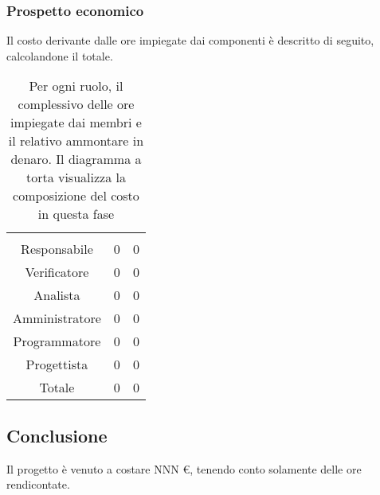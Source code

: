 \subsubsection{Prospetto economico}
Il costo derivante dalle ore impiegate dai componenti è descritto di seguito, calcolandone il totale.

\begin{table}[hbt!]
{\setlength{\parindent}{0cm}
\begin{minipage}{.43\textwidth}
	\begin{tabular}{ccc}
	\rowcolorhead
	\headertitle{Ruolo} & \headertitle{Ore} & \headertitle{Costo(€)}\\
	Responsabile & 0 & 0\\
	Verificatore & 0 & 0\\
	Analista & 0 & 0\\
	Amministratore & 0 & 0\\
	Programmatore & 0 & 0\\
	Progettista & 0 & 0\\
	\hline
	Totale & 0& 0\\
	\end{tabular}
\end{minipage}%
\begin{minipage}{.57\textwidth}
\end{minipage} }
\caption{Per ogni ruolo, il complessivo delle ore impiegate dai membri e il relativo ammontare in denaro. Il diagramma a torta visualizza la composizione del costo in questa fase}
\end{table}


\subsection{Conclusione}
Il progetto è venuto a costare NNN €, tenendo conto solamente delle ore rendicontate.
